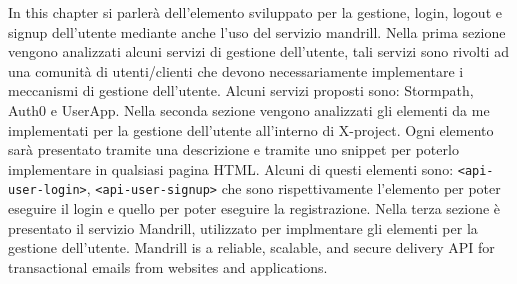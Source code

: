 In this chapter si parlerà dell'elemento sviluppato per la gestione, login, logout e signup dell'utente mediante anche l'uso del servizio mandrill. 
Nella prima sezione vengono analizzati alcuni servizi di gestione dell'utente, tali servizi sono rivolti ad una comunità di utenti/clienti che devono necessariamente implementare i meccanismi di gestione dell'utente.
Alcuni servizi proposti sono: Stormpath, Auth0 e UserApp.
Nella seconda sezione vengono analizzati gli elementi da me implementati per la gestione dell'utente all'interno di X-project. Ogni elemento sarà presentato tramite una descrizione e tramite uno snippet per poterlo implementare in qualsiasi pagina HTML. Alcuni di questi elementi sono: \texttt{<api-user-login>}, 
\texttt{<api-user-signup>} che sono rispettivamente l'elemento per poter eseguire il login e quello per poter eseguire la registrazione.
Nella terza sezione è presentato il servizio Mandrill, utilizzato per implmentare gli elementi per la gestione dell'utente. Mandrill is a reliable, scalable, and secure delivery API for transactional emails from websites and applications.
